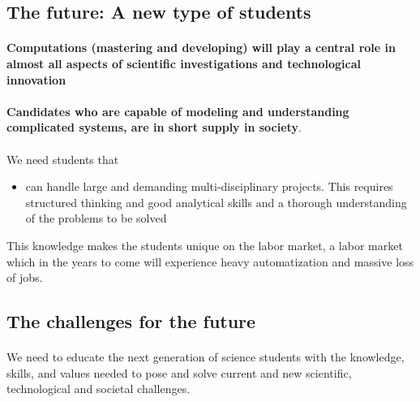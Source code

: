 \documentclass[%
oneside,                 %
final,                   %
10pt]{article}
\begin{document}
\subsection{The future: A new type of students}


\paragraph{}
\textbf{Computations (mastering and developing)  will play a central role in almost all aspects of scientific investigations and technological innovation}




\paragraph{}
\textbf{Candidates who are capable of modeling and understanding complicated
systems, are in short supply in society}.



\paragraph{}
We need students that
\begin{itemize}
\item can handle large and demanding multi-disciplinary  projects. This requires structured thinking and good analytical skills and a thorough understanding of the problems to be solved
\end{itemize}

\noindent
This knowledge makes the students unique on the labor market, a labor market which in the years to come will experience heavy automatization and massive loss of jobs.






\subsection{The challenges for the future}

\paragraph{}
We need to educate the next generation of
science students with the knowledge, skills, and values needed to pose
and solve current and new scientific, technological and societal
challenges.
\end{document}
